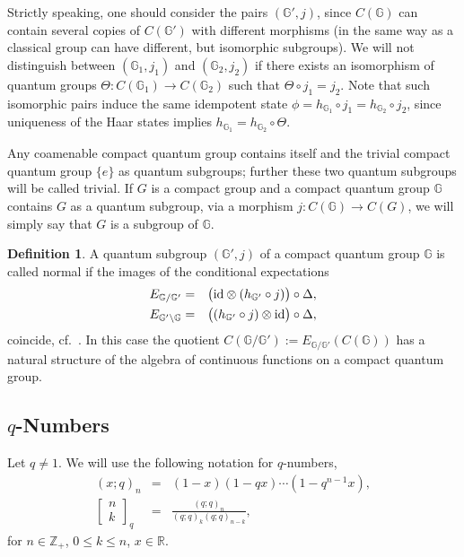 \documentclass[12pt]{amsart}
\theoremstyle{definition}
\newtheorem{definition}[theorem]{Definition}
\theoremstyle{remark}
\numberwithin{equation}{section}
\begin{document}
Strictly speaking, one should consider the pairs $({\mathbb{G}}',j)$, since $C({\mathbb{G}})$ can contain several copies of 
$C({\mathbb{G}}')$ with different morphisms (in the same way as a classical group can have different, but isomorphic 
subgroups). We will not distinguish between $({\mathbb{G}}_1,j_1)$ and $({\mathbb{G}}_2,j_2)$ if there exists an isomorphism of 
quantum groups $\Theta:C({\mathbb{G}}_1)\to C({\mathbb{G}}_2)$ such that $\Theta\circ j_1=j_2$. Note that such isomorphic pairs 
induce the same idempotent state $\phi=h_{{\mathbb{G}}_1}\circ j_1=h_{{\mathbb{G}}_2}\circ j_2$, since uniqueness of the Haar 
states implies $h_{{\mathbb{G}}_1}=h_{{\mathbb{G}}_2}\circ \Theta$.

Any coamenable compact quantum group contains itself and the trivial compact quantum group $\{e\}$ as quantum subgroups;
further these two quantum subgroups will be called trivial. If $G$ is a compact group and a compact quantum group ${\mathbb{G}}$
contains $G$ as a quantum subgroup, via a morphism $j:C({\mathbb{G}})\to C(G)$, we will  simply say that $G$ is a subgroup of
${\mathbb{G}}$.

\begin{definition}
A quantum subgroup $({\mathbb{G}}',j)$ of a compact quantum group ${\mathbb{G}}$ is called normal if the images of the conditional 
expectations
\begin{eqnarray*}
E_{{\mathbb{G}}/{\mathbb{G}}'} &=& \big({\rm id}\otimes (h_{{\mathbb{G}}'}\circ j)\big)\circ \Delta, \\
E_{{\mathbb{G}}'\backslash {\mathbb{G}}} &=& \big((h_{{\mathbb{G}}'}\circ j)\otimes {\rm id}\big)\circ \Delta,
\end{eqnarray*}
coincide, cf.\ \cite[Proposition 2.1 and Definition 2.2]{wang08}. In this case
the quotient $C({\mathbb{G}}/{\mathbb{G}}'):=E_{{\mathbb{G}}/{\mathbb{G}}'}(C({\mathbb{G}}))$ has a natural structure of the algebra of continuous functions on a compact quantum group. \label{defnormal}
\end{definition}

\subsection{$q$-Numbers}
Let $q\not=1$. We will use the following notation for $q$-numbers,
\begin{eqnarray*}
(x;q)_n &=& (1-x)(1-qx)\cdots(1-q^{n-1}x), \\
\left[\begin{array}{cc} n \\ k \end{array}\right]_q &=& \frac{(q;q)_n}{(q;q)_k(q;q)_{n-k}},
\end{eqnarray*}
for $n\in\mathbb{Z}_+$, $0\le k \le n$, $x \in \mathbb{R}$.
\end{document}
